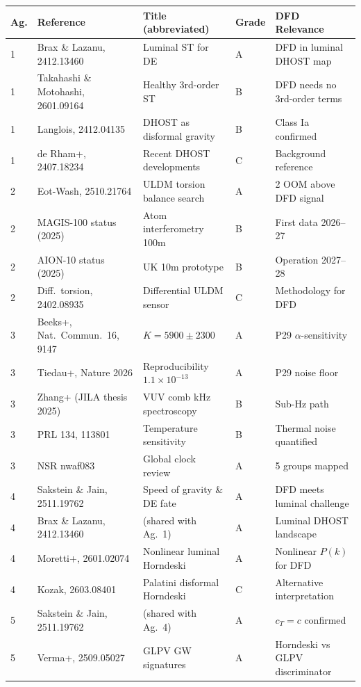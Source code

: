 \documentclass[11pt,a4paper]{article}
\begin{document}
\begin{longtable}{p{0.5cm}p{3.5cm}p{3.5cm}p{1cm}p{3.5cm}}
\toprule
\textbf{Ag.} & \textbf{Reference} & \textbf{Title (abbreviated)} & \textbf{Grade} & \textbf{DFD Relevance} \\
\midrule
\endhead
1 & Brax \& Lazanu, 2412.13460 & Luminal ST for DE & A & DFD in luminal DHOST map \\
1 & Takahashi \& Motohashi, 2601.09164 & Healthy 3rd-order ST & B & DFD needs no 3rd-order terms \\
1 & Langlois, 2412.04135 & DHOST as disformal gravity & B & Class Ia confirmed \\
1 & de Rham+, 2407.18234 & Recent DHOST developments & C & Background reference \\
\midrule
2 & Eot-Wash, 2510.21764 & ULDM torsion balance search & A & 2 OOM above DFD signal \\
2 & MAGIS-100 status (2025) & Atom interferometry 100m & B & First data 2026--27 \\
2 & AION-10 status (2025) & UK 10m prototype & B & Operation 2027--28 \\
2 & Diff.\ torsion, 2402.08935 & Differential ULDM sensor & C & Methodology for DFD \\
\midrule
3 & Beeks+, Nat.\ Commun.\ 16, 9147 & $K = 5900 \pm 2300$ & A & P29 $\alpha$-sensitivity \\
3 & Tiedau+, Nature 2026 & Reproducibility $1.1\times10^{-13}$ & A & P29 noise floor \\
3 & Zhang+ (JILA thesis 2025) & VUV comb kHz spectroscopy & B & Sub-Hz path \\
3 & PRL 134, 113801 & Temperature sensitivity & B & Thermal noise quantified \\
3 & NSR nwaf083 & Global clock review & A & 5 groups mapped \\
\midrule
4 & Sakstein \& Jain, 2511.19762 & Speed of gravity \& DE fate & A & DFD meets luminal challenge \\
4 & Brax \& Lazanu, 2412.13460 & (shared with Ag.\ 1) & A & Luminal DHOST landscape \\
4 & Moretti+, 2601.02074 & Nonlinear luminal Horndeski & A & Nonlinear $P(k)$ for DFD \\
4 & Kozak, 2603.08401 & Palatini disformal Horndeski & C & Alternative interpretation \\
\midrule
5 & Sakstein \& Jain, 2511.19762 & (shared with Ag.\ 4) & A & $c_T = c$ confirmed \\
5 & Verma+, 2509.05027 & GLPV GW signatures & A & Horndeski vs GLPV discriminator \\

\end{longtable}
\end{document}
